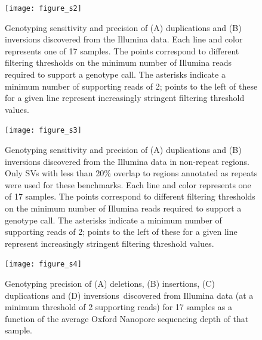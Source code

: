 \documentclass[12pt]{article}
\newenvironment{cfigure}
	{\begin{figure} \centering}
	{\end{figure}}
\begin{document}
\clearpage%

\begin{cfigure}
	\texttt{[image: figure\_s2]}
	
	\caption[Sensitivity and precision of Illumina duplication and inversion genotyping]{
		Genotyping sensitivity and precision of (A) duplications and (B) inversions discovered from the Illumina data.
		Each line and color represents one of 17 samples. 
		The points correspond to different filtering thresholds on the minimum number of Illumina reads required to support a genotype call.
		The asterisks indicate a minimum number of supporting reads of 2; points to the left of these for a given line represent increasingly stringent filtering threshold values.
	}

	\label{fig_s2}

\end{cfigure}

\clearpage%

\begin{cfigure}
	\texttt{[image: figure\_s3]}

	\caption[Sensitivity and precision of Illumina duplication and inversion genotyping in non-repeat regions]{
		Genotyping sensitivity and precision of (A) duplications and (B) inversions discovered from the Illumina data in non-repeat regions.
		Only SVs with less than 20\% overlap to regions annotated as repeats were used for these benchmarks. 
		Each line and color represents one of 17 samples. 
		The points correspond to different filtering thresholds on the minimum number of Illumina reads required to support a genotype call.
		The asterisks indicate a minimum number of supporting reads of 2; points to the left of these for a given line represent increasingly stringent filtering threshold values.
	}

	\label{fig_s3}

\end{cfigure}

\clearpage%

\begin{cfigure}
	\texttt{[image: figure\_s4]}

	\caption[Relationship between Oxford Nanopore sequencing depth and genotyping precision of Illumina SVs]{
		Genotyping precision of (A) deletions, (B) insertions, (C) duplications and (D) inversions~discovered from Illumina data (at a minimum threshold of 2 supporting reads) for 17 samples as a function of the average Oxford Nanopore sequencing depth of that sample.
	}

	\label{fig_s4}

\end{cfigure}
\end{document}
